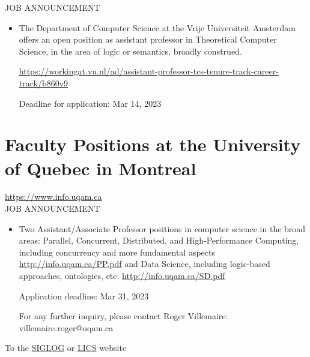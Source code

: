 \documentclass[prodmode,acmtecs]{acmsmall} %
\begin{document}
JOB ANNOUNCEMENT 

\begin{itemize}\item  The Department of Computer Science at the Vrije Universiteit Amsterdam offers an open position as assistant professor in Theoretical Computer Science, in the area of logic or semantics, broadly construed. 
 
  \href{https://workingat.vu.nl/ad/assistant-professor-tcs-tenure-track-career-track/b860v9}{https://workingat.vu.nl/ad/assistant-professor-tcs-tenure-track-career-track/b860v9} 
 
Deadline for application: Mar 14, 2023 
 
\end{itemize}\section{Faculty Positions at the University of Quebec in Montreal}\label{FacultyPositionsattheUniversityofQuebecinMontreal}  \href{https://www.info.uqam.ca}{https://www.info.uqam.ca}\\ 
JOB ANNOUNCEMENT 

\begin{itemize}\item  Two Assistant/Associate Professor positions in computer science in the broad areas: Parallel, Concurrent, Distributed, and High-Performance Computing, including concurrency and more fundamental aspects \href{http://info.uqam.ca/PP.pdf}{http://info.uqam.ca/PP.pdf} and Data Science, including logic-based approaches, ontologies, etc. \href{http://info.uqam.ca/SD.pdf}{http://info.uqam.ca/SD.pdf} 
 
Application deadline: Mar 31, 2023 
 
  For any further inquiry, please contact Roger Villemaire: villemaire.roger@uqam.ca 
 
\end{itemize}


To the \href{http://siglog.org/}{SIGLOG} or \href{https://lics.siglog.org}{LICS} website
\end{document}

